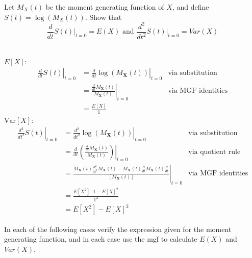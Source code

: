 \documentclass[12pt,letterpaper]{exam}
\begin{document}
\begin{questions}
\begin{solution}
			
			
			
			
			
			
			
			
			
		
	\end{solution}
	
	\setcounter{question}{31}
	\question  Let $M_X(t)$ be the moment generating function of $X$, and define $S(t) = \log{(M_X(t))}$. Show that
	$$ \frac{d}{dt} \left. S(t) \right|_{t=0} = E(X) \text{ and }  \frac{d^2}{dt^2} \left. S(t) \right|_{t=0} = Var(X)$$
	\begin{solution} \\
		\(E[X]\):
		\begin{align*}
			\left. \frac{d}{dt}S(t) \right|_{t=0} &= \left. \frac{d}{dt}\log(M_\mathbf{X}(t)) \right|_{t=0} &\text{via substitution}\\
			&= \left. \frac{\frac{d}{dt}M_\mathbf{X}(t)}{M_\mathbf{X}(t)} \right|_{t=0} &\text{via MGF identities} \\
			&= \frac{E[X]}{1}
		\end{align*}
		\(\text{Var}[X]\):
		\begin{align*}
			\left. \frac{d^2}{dt^2}S(t) \right|_{t=0} &= \left. \frac{d^2}{dt^2}\log(M_\mathbf{X}(t)) \right|_{t=0} &\text{via substitution}\\
			&= \left. \frac{d}{dt} \left( \frac{\frac{d}{dt}M_\mathbf{X}(t)}{M_\mathbf{X}(t)} \right) \right|_{t=0} &\text{via quotient rule} \\
			&= \left. \frac{
				M_\mathbf{X}(t)\frac{d^2}{dt^2} M_\mathbf{X}(t)-M_\mathbf{X}(t) \frac{d}{dt}M_\mathbf{X}(t) \frac{d}{dt} 
				}{ 
				\left[M_\mathbf{X}(t)\right] 
				} \right|_{t=0} &\text{via MGF identities} \\
			&= \frac{ E[X^2]\cdot1 - E[X]^2 }{ 1^2 } \\
			&= E[X^2] - E[X]^2
		\end{align*}
		
	\end{solution}
	
	\question  In each of the following cases verify the expression given for the moment generating function, and in each case use the mgf to calculate $E(X)$ and $Var(X)$.
\end{questions}
\end{document}
